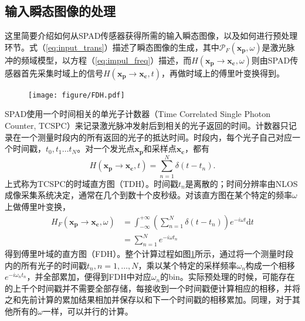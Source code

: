 \documentclass[master]{shtthesis}             %
\begin{document}
\subsection{输入瞬态图像的处理}\label{sec:input_img_proc}

这里简要介绍如何从SPAD传感器获得所需的输入瞬态图像，以及如何进行预处理环节。式（\ref{eq:input_trans}）描述了瞬态图像的生成，其中$\mathcal{P}_F(\mathbf{x_p},\omega)$是激光脉冲的频域模型，以方程（\ref{eq:impul_freq}）描述，而$H(\mathbf{x_p}\rightarrow \mathbf{x_c},\omega)$则由SPAD传感器首先采集时域上的信号$H(\mathbf{x_p}\rightarrow \mathbf{x_c},t)$，再做时域上的傅里叶变换得到。

\begin{figure}[!tb]
  \centering
  \texttt{[image: figure/FDH.pdf]}
  \label{fig:fdh}
\end{figure}

SPAD使用一个时间相关的单光子计数器（Time Correlated Single Photon Counter, TCSPC）来记录激光脉冲发射后到相关的光子返回的时间。计数器只记录在一个测量时段内的所有返回的光子的抵达时间。时段内，每个光子自己对应一个时间戳，$t_0, t_1\dots t_N$。对一个发光点$\mathbf{x_p}$和采样点$\mathbf{x_c}$，都有
\begin{equation}
  H(\mathbf{x_p}\rightarrow \mathbf{x_c},t) = \sum_{n=1}^N \delta(t-t_n).
\end{equation}
上式称为TCSPC的时域直方图（TDH）。时间戳$t_n$是离散的；时间分辨率由NLOS成像采集系统决定，通常在几个到数十个皮秒级。对该直方图在某个特定的频率$\omega$上做傅里叶变换，
\begin{equation}
  \begin{split}
    H_F(\mathbf{x_p}\rightarrow \mathbf{x_c},\omega) &= \int_{-\infty}^{+\infty} \left( \sum_{n=1}^N \delta(t-t_n) \right) e^{-i\omega t} \text{d}t \\
    &= \sum_{n=1}^N e^{-i\omega t_n}
  \end{split}
\end{equation}
得到傅里叶域的直方图（FDH）。整个计算过程如图\ref{fig:fdh}所示，通过将一个测量时段内的所有光子的时间戳$t_n, n=1,\dots,N$，乘以某个特定的采样频率$\omega_n$构成一个相移$e^{-i\omega_n t_n}$，并全部累加，便得到FDH中对应$\omega_n$的bin。实际预处理的时候，可能存在的上千个时间戳并不需要全部存储，每接收到一个时间戳便计算相应的相移，并将之和先前计算的累加结果相加并保存以和下一个时间戳的相移累加。同理，对于其他所有的$\omega$一样，可以并行的计算。
\end{document}
